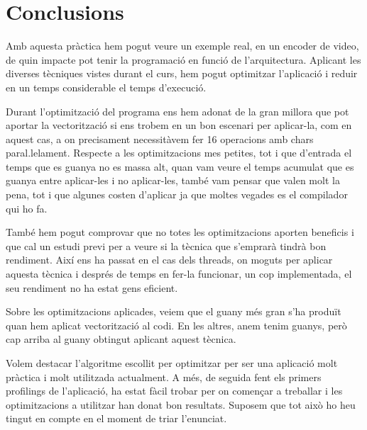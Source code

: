 \chapter{Conclusions}

Amb aquesta pràctica hem pogut veure un exemple real, en un encoder de video, de quin impacte pot tenir la programació en funció de l'arquitectura. Aplicant les diverses tècniques vistes durant el curs, hem pogut optimitzar l'aplicació i reduir en un temps considerable el temps d'execució.

Durant l'optimització del programa ens hem adonat de la gran millora que pot aportar la vectorització si ens trobem en un bon escenari per aplicar-la, com en aquest cas, a on precisament necessitàvem fer 16 operacions amb chars paral.lelament. Respecte a les optimitzacions mes petites, tot i que d'entrada el temps que es guanya no es massa alt, quan vam veure el temps acumulat que es guanya entre aplicar-les i no aplicar-les, també vam pensar que valen molt la pena, tot i que algunes costen d'aplicar ja que moltes vegades es el compilador qui ho fa.

També hem pogut comprovar que no totes les optimitzacions aporten beneficis i que cal un estudi previ per a veure si la tècnica que s'emprarà tindrà bon rendiment. Així ens ha passat en el cas dels threads, on moguts per aplicar aquesta tècnica i després de temps en fer-la funcionar, un cop implementada, el seu rendiment no ha estat gens eficient. 

Sobre les optimitzacions aplicades, veiem que el guany més gran s'ha produït quan hem aplicat vectorització al codi. En les altres, anem tenim guanys, però cap arriba al guany obtingut aplicant aquest tècnica. 

Volem destacar l'algoritme escollit per optimitzar per ser una aplicació molt pràctica i molt utilitzada actualment. A més, de seguida fent els primers profilings de l'aplicació, ha estat fàcil trobar per on començar a treballar i les optimitzacions a utilitzar han donat bon resultats. Suposem que tot això ho heu tingut en compte en el moment de triar l'enunciat.
